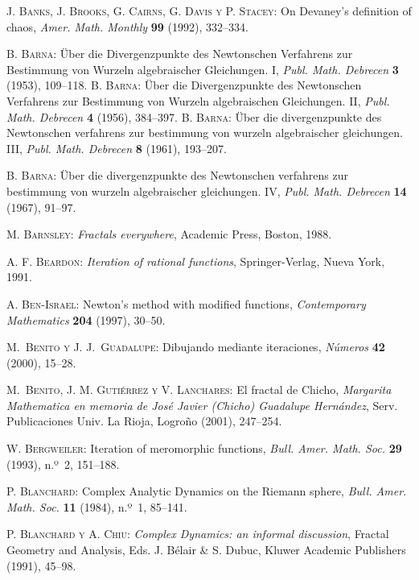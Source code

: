 \begin{thebibliography}{999}
\textsc{J. Banks, J. Brooks, G. Cairns, G. Davis y P. Stacey}:
{On Devaney's definition of chaos},
\textit{Amer. Math. Monthly} \textbf{99} (1992),  332--334.

 \textsc{B. Barna}: \"{U}ber die Divergenzpunkte des Newtonschen Verfahrens zur Bestimmung von
Wurzeln algebraischer Gleichungen. I, \textit{Publ. Math. Debrecen} \textbf{3} (1953), 109--118.
 \textsc{B. Barna}: \"{U}ber die Divergenzpunkte des Newtonschen Verfahrens zur Bestimmung von
Wurzeln algebraischen Gleichungen. II, \textit{Publ. Math. Debrecen} \textbf{4} (1956), 384--397.
 \textsc{B. Barna}: \"{U}ber die divergenzpunkte des Newtonschen verfahrens zur bestimmung von
wurzeln algebraischer gleichungen. III, \textit{Publ. Math. Debrecen} \textbf{8} (1961), 193--207.

 \textsc{B. Barna}: \"{U}ber die divergenzpunkte des Newtonschen verfahrens zur bestimmung von
wurzeln algebraischer gleichungen. IV, \textit{Publ. Math. Debrecen} \textbf{14} (1967), 91--97.

\textsc{M. Barnsley}:
\textit{Fractals everywhere},
Academic Press, Boston, 1988.

\textsc{A. F.  Beardon}:
\textit{Iteration of rational functions},
Springer-Verlag, Nueva York, 1991.

 \textsc{A. Ben-Israel}:
{Newton's method with modified functions},
\textit{Contemporary Mathematics} \textbf{204} (1997),  30--50.

 \textsc{M.~Benito y J. J.~Guadalupe}:
{Dibujando mediante iteraciones},
\textit{Números} \textbf{42} (2000), 15--28.

 \textsc{M.~Benito, J. M. Gutiérrez y V. Lanchares}:
{El fractal de Chicho},
\textit{Margarita Mathematica en memoria de José Javier (Chicho) Guadalupe Hernández}, 
Serv. Publicaciones Univ. La Rioja, Logroño (2001),  247--254.

\textsc{W. Bergweiler}:
{Iteration of meromorphic functions},
\textit{Bull. Amer. Math. Soc.} \textbf{29} (1993), n.º~2, 151--188.

\textsc{P. Blanchard}:
{Complex Analytic Dynamics on the Riemann sphere},
\textit{Bull. Amer. Math. Soc.} \textbf{11} (1984), n.º~1, 85--141.

\textsc{P. Blanchard y A. Chiu}:
\textit{Complex Dynamics: an informal discussion},
Fractal Geometry and Analysis, Eds. J. Bélair  \&
S. Dubuc, Kluwer Academic Publishers (1991), 45--98.


\end{thebibliography}
